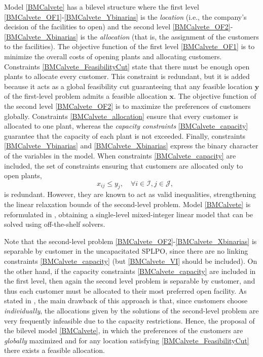 \documentclass[preprint,11pt,authoryear]{elsarticle}
\def\J{\mathcal{J}}
\def\I{\mathcal{I}}
\begin{document}
Model \eqref{BMCalvete} has a bilevel structure where the first level \eqref{BMCalvete_OF1}-\eqref{BMCalvete_Ybinarias} is the \emph{location} (i.e., the company's decision of the facilities to open) and the second level \eqref{BMCalvete_OF2}-\eqref{BMCalvete_Xbinarias} is the \emph{allocation} (that is, the assignment of the customers to the facilities). The objective function of the first level \eqref{BMCalvete_OF1} is to minimize the overall costs of opening plants and allocating customers. Constraints \eqref{BMCalvete_FeasibilityCut} state that there must be enough open plants to allocate every customer. This constraint is redundant, but it is added because it acts as a global feasibility cut guaranteeing that any feasible location $\boldsymbol{y}$ of the first-level problem admits a feasible allocation $\boldsymbol{x}$. The objective function of the second level \eqref{BMCalvete_OF2} is to maximize the preferences of customers globally. Constraints \eqref{BMCalvete_allocation} ensure that every customer is allocated to one plant, whereas the \textit{capacity constraints} \eqref{BMCalvete_capacity} guarantee that the capacity of each plant is not exceeded. Finally, constraints \eqref{BMCalvete_Ybinarias} and \eqref{BMCalvete_Xbinarias} express the binary character of the variables in the model. When constraints \eqref{BMCalvete_capacity} are included, the set of constraints ensuring that customers are allocated only to open plants,
\begin{equation} \label{BMCalvete_VI}
    \quad x_{ij} \le y_j, \quad \forall i \in \I, j \in \J,
\end{equation}
\noindent is redundant. However, they are known to act as valid inequalities, strengthening the linear relaxation bounds of the second-level problem. Model \eqref{BMCalvete} is reformulated in \cite{calvete2020}, obtaining a single-level mixed-integer linear model that can be solved using off-the-shelf solvers.

Note that the second-level problem \eqref{BMCalvete_OF2}-\eqref{BMCalvete_Xbinarias} is separable by customer in the uncapacitated SPLPO, since there are no linking constraints \eqref{BMCalvete_capacity} (but \eqref{BMCalvete_VI} should be included). On the other hand, if the capacity constraints \eqref{BMCalvete_capacity} are included in the first level, then again the second level problem is separable by customer, and thus each customer must be allocated to their most preferred open facility. As stated in \cite{calvete2020}, the main drawback of this approach is that, since customers choose \textit{individually}, the allocations given by the solutions of the second-level problem are very frequently infeasible due to the capacity restrictions. Hence, the proposal of the bilevel model \eqref{BMCalvete}, in which the preferences of the customers are \textit{globally} maximized and for any location satisfying \eqref{BMCalvete_FeasibilityCut} there exists a feasible allocation.
\end{document}
